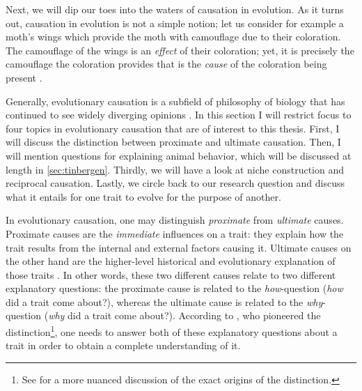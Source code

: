 Next, we will dip our toes into the waters of causation in evolution. As it turns out, causation in evolution is not a simple notion; let us consider for example a moth's wings which provide the moth with camouflage due to their coloration. The camouflage of the wings is an \emph{effect} of their coloration; yet, it is precisely the camouflage the coloration provides that is the \emph{cause} of the coloration being present \citep{Lipton09}.

Generally, evolutionary causation is a subfield of philosophy of biology that has continued to see widely diverging opinions \citep{Baedke2021, UllerLaland19, S-P13}. In this section I will restrict focus to four topics in evolutionary causation that are of interest to this thesis. First, I will discuss the distinction between proximate and ultimate causation. Then, I will mention  questions for explaining animal behavior, which will be discussed at length in \cref{sec:tinbergen}. Thirdly, we will have a look at niche construction and reciprocal causation. Lastly, we circle back to our research question and discuss what it entails for one trait to evolve for the purpose of another.

In evolutionary causation, one may distinguish \emph{proximate} from \emph{ultimate} causes.
Proximate causes are the \emph{immediate} influences on a trait: they explain how the trait results from the internal and external factors causing it.
Ultimate causes on the other hand are the higher-level historical and evolutionary explanation of those traits \citep{Mayr61}. In other words, these two different causes relate to two different explanatory questions: the proximate cause is related to the \emph{how}-question (\emph{how} did a trait come about?), whereas the ultimate cause is related to the \emph{why}-question (\emph{why} did a trait come about?). According to \citet{Mayr61}, who pioneered the distinction\footnote{See \citep{Laland13} for a more nuanced discussion of the exact origins of the distinction.}, one needs to answer both of these explanatory questions about a trait in order to obtain a complete understanding of it.

